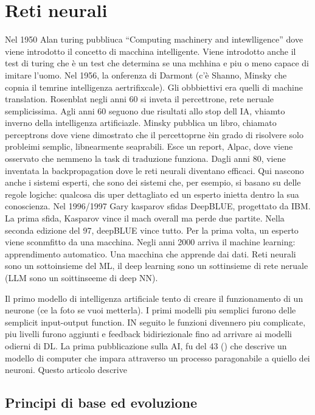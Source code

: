 
\chapter{Reti neurali}\label{chp:neural-networks}
% 
Nel 1950 Alan turing pubbliuca ``Computing machinery and intewlligence'' dove viene introdotto il concetto di macchina intelligente. Viene introdotto anche il test di turing che è un test che determina se una mchhina e piu o meno capace di imitare l'uomo. Nel 1956, la onferenza di Darmont (c'è Shanno, Minsky che copnia il temrine intelligenza aertrifixcale). Gli obbbiettivi era quelli di machine translation. Rosenblat negli anni 60 si inveta il percettrone, rete neruale semplicissima. Agli anni 60 seguono due risultati allo stop dell IA, vhiamto inverno della intelligenza artificiazle. Minsky pubblica un libro, chiamato perceptrons dove viene dimostrato che il percettoprne èin grado di risolvere solo probleimi semplic, libnearmente seaprabili. Esce un report, Alpac, dove viene osservato che nemmeno la task di traduzione funziona. Dagli anni 80, viene inventata la backpropagation dove le reti neurali diventano efficaci. Qui nascono anche i sistemi esperti, che sono dei sistemi che, per esempio, si basano su delle regole logiche: qualcosa dis uper dettagliato ed un esperto inietta dentro la sua conoscienza. Nel 1996/1997 Gary kasparov sfidas DeepBLUE, progettato da IBM. La prima sfida, Kasparov vince il mach overall ma perde due partite. Nella seconda edizione del 97, deepBLUE vince tutto. Per la prima volta, un esperto viene sconmfitto da una macchina. Negli anni 2000 arriva il machine learning: apprendimento automatico. Una macchina che apprende dai dati.  Reti neurali sono un sottoinsieme del ML, il deep learning sono un sottinsieme di rete neruale (LLM sono un soittinseeme di deep NN). 

Il primo modello di intelligenza artificiale tento di creare il funzionamento di un neurone (ce la foto se vuoi metterla). I primi modelli piu semplici furono delle semplicit input-output function. IN seguito le funzioni divennero piu complicate, piu livelli furono aggiunti e feedback bidiriezionale fino ad arrivare ai modelli odierni di DL. La prima pubblicazione sulla AI, fu del 43 (\cite{mcculloch1943logical}) che descrive un modello di computer che impara attraverso un processo paragonabile a quiello dei neuroni. Questo articolo descrive 

\cite{muthukrishnan2020brief}

\section{Principi di base ed evoluzione}

